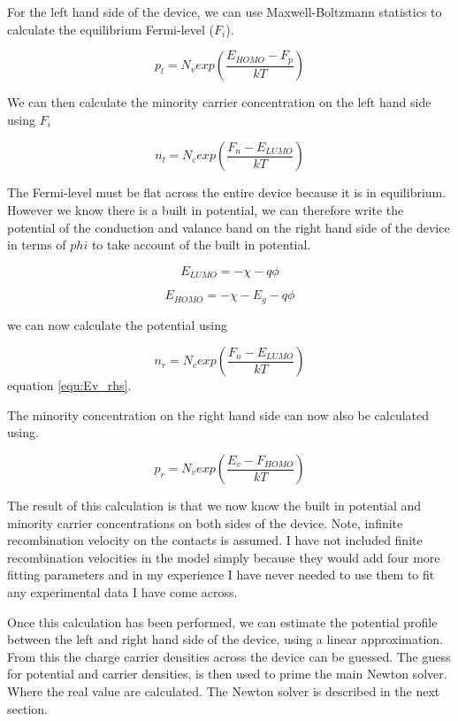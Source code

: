 For the left hand side of the device, we can use Maxwell-Boltzmann statistics to calculate the equilibrium Fermi-level ($F_i$).

\begin{equation}
p_{l}=N_v exp \left(\frac{E_{HOMO}-F_p}{kT} \right)
\end{equation}

We can then calculate the minority carrier concentration on the left hand side using $F_i$

\begin{equation}
n_{l}=N_c exp \left (\frac{F_n-E_{LUMO}}{kT} \right)
\end{equation}

The Fermi-level must be flat across the entire device because it is in equilibrium.  However we know there is a built in potential, we can therefore write the potential of the conduction and valance band on the right hand side of the device in terms of $phi$ to take account of the built in potential.

\begin{equation}
E_{LUMO}=-\chi-q\phi
\label{equ:Ev_rhs}
\end{equation}

\begin{equation}
E_{HOMO}=-\chi-E_g-q\phi
\end{equation}

we can now calculate the potential using

\begin{equation}
n_{r}=N_c exp \left (\frac{F_n-E_{LUMO}}{kT} \right)
\end{equation}
equation \ref{equ:Ev_rhs}.

The minority concentration on the right hand side can now also be calculated using.

\begin{equation}
p_{r}=N_v exp \left (\frac{E_v-F_{HOMO}}{kT} \right)
\end{equation}

The result of this calculation is that we now know the built in potential and minority carrier concentrations on both sides of the device.  Note, infinite recombination velocity on the contacts is assumed.  I have not included finite recombination velocities in the model simply because they would add four more fitting parameters and in my experience I have never needed to use them to fit any experimental data I have come across.

Once this calculation has been performed, we can estimate the potential profile between the left and right hand side of the device, using a linear approximation. From this the charge carrier densities across the device can be guessed.  The guess for potential and carrier densities, is then used to prime the main Newton solver.  Where the real value are calculated.  The Newton solver is described in the next section.



